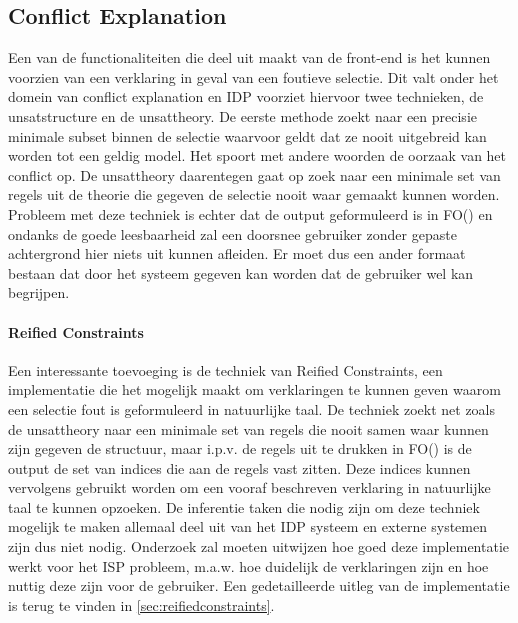 \subsection{Conflict Explanation}
Een van de functionaliteiten die deel uit maakt van de front-end is het kunnen voorzien van een verklaring in geval van een foutieve selectie. Dit valt onder het domein van conflict explanation en IDP voorziet hiervoor twee technieken, de unsatstructure en de unsattheory. De eerste methode zoekt naar een precisie minimale subset binnen de selectie waarvoor geldt dat ze nooit uitgebreid kan worden tot een geldig model. Het spoort met andere woorden de oorzaak van het conflict op. De unsattheory daarentegen gaat op zoek naar een minimale set van regels uit de theorie die gegeven de selectie nooit waar gemaakt kunnen worden. Probleem met deze techniek is echter dat de output geformuleerd is in FO(\textperiodcentered) en ondanks de goede leesbaarheid zal een doorsnee gebruiker zonder gepaste achtergrond hier niets uit kunnen afleiden. Er moet dus een ander formaat bestaan dat door het systeem gegeven kan worden dat de gebruiker wel kan begrijpen. 

\paragraph{Reified Constraints}
Een interessante toevoeging is de techniek van Reified Constraints, een implementatie die het mogelijk maakt om verklaringen te kunnen geven waarom een selectie fout is geformuleerd in natuurlijke taal. De techniek zoekt net zoals de unsattheory naar een minimale set van regels die nooit samen waar kunnen zijn gegeven de structuur, maar i.p.v. de regels uit te drukken in FO(\textperiodcentered) is de output de set van indices die aan de regels vast zitten. Deze indices kunnen vervolgens gebruikt worden om een vooraf beschreven verklaring in natuurlijke taal te kunnen opzoeken. De inferentie taken die nodig zijn om deze techniek mogelijk te maken allemaal deel uit van het IDP systeem en externe systemen zijn dus niet nodig. Onderzoek zal moeten uitwijzen hoe goed deze implementatie werkt voor het ISP probleem, m.a.w. hoe duidelijk de verklaringen zijn en hoe nuttig deze zijn voor de gebruiker. Een gedetailleerde uitleg van de implementatie is terug te vinden in \ref{sec:reifiedconstraints}.

